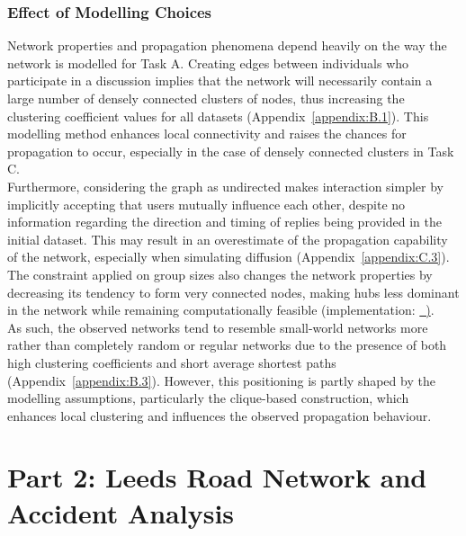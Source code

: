 \documentclass[acmsmall,nonacm,natbib=false]{acmart}
\newcommand{\githublink}[2]{\href{#1}{\faGithub\ #2}}
\begin{document}
\subsubsection{\textbf{\Large{Effect of Modelling Choices}}}
\leavevmode \par \noindent
Network properties and propagation phenomena depend heavily on the way the network is modelled for Task A. Creating edges between individuals who participate in a discussion implies that the network will necessarily contain a large number of densely connected clusters of nodes, thus increasing the clustering coefficient values for all datasets (Appendix~\ref{appendix:B.1}). This modelling method enhances local connectivity and raises the chances for propagation to occur, especially in the case of densely connected clusters in Task C.\\
Furthermore, considering the graph as undirected makes interaction simpler by implicitly accepting that users mutually influence each other, despite no information regarding the direction and timing of replies being provided in the initial dataset. This may result in an overestimate of the propagation capability of the network, especially when simulating diffusion (Appendix~\ref{appendix:C.3}). The constraint applied on group sizes also changes the network properties by decreasing its tendency to form very connected nodes, making hubs less dominant in the network while remaining computationally feasible (implementation: \githublink{https://github.kcl.ac.uk/k25038453/network-data-analysis-coursework/blob/main/notebooks/part\_1/taskA.ipynb}).\\ 
As such, the observed networks tend to resemble small-world networks more rather than completely random or regular networks due to the presence of both high clustering coefficients and short average shortest paths (Appendix~\ref{appendix:B.3}). However, this positioning is partly shaped by the modelling assumptions, particularly the clique-based construction, which enhances local clustering and influences the observed propagation behaviour.






\section{\LARGE{Part 2: Leeds Road Network and Accident Analysis}}
\end{document}
